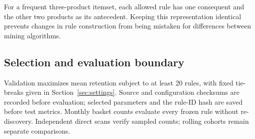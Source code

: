 For a frequent three-product itemset, each allowed rule has one consequent and the other two products as its antecedent. Keeping this representation identical prevents changes in rule construction from being mistaken for differences between mining algorithms.

\subsection{Selection and evaluation boundary}
Validation maximizes mean retention subject to at least 20 rules, with fixed tie-breaks given in Section~\ref{sec:settings}. Source and configuration checksums are recorded before evaluation; selected parameters and the rule-ID hash are saved before test metrics. Monthly basket counts evaluate every frozen rule without re-discovery. Independent direct scans verify sampled counts; rolling cohorts remain separate comparisons.

